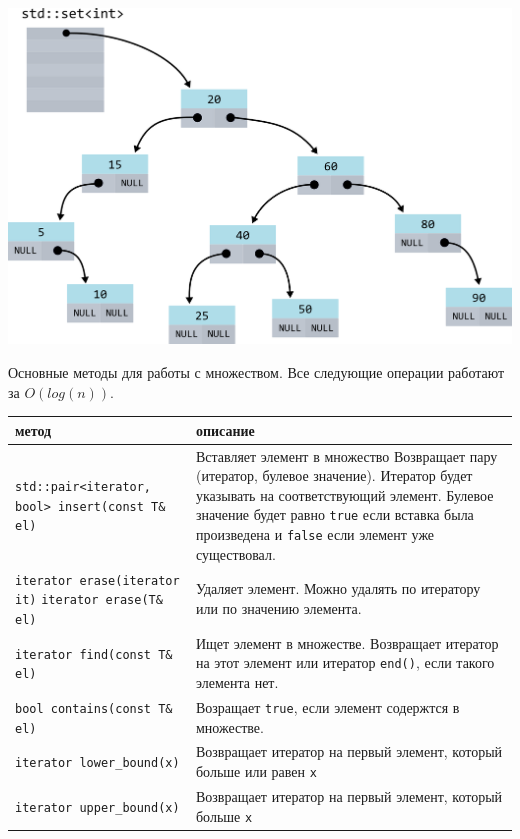 \documentclass{article}
\begin{document}
\begin{center}
\includegraphics[scale=1]{../images/set_internals.png}
\end{center}

Основные методы для работы с множеством. Все следующие операции работают за $O(log(n))$.

\bgroup
\def\arraystretch{2}%
\begin{tabular}{ p{5cm} | p{12cm} }
метод & описание 
\\ \hline

\texttt{std::pair<iterator, bool> \newline insert(const T\& el)}
& Вставляет элемент в множество \newline
Возвращает пару (итератор, булевое значение). Итератор будет указывать на соответствующий элемент.
Булевое значение будет равно \texttt{true} если вставка была произведена и \texttt{false} если
элемент уже существовал.
\\ \hline

\texttt{iterator erase(iterator it)}  \newline 
\texttt{iterator erase(T\& el)}
& Удаляет элемент. Можно удалять по итератору или по значению элемента.
\\ \hline

\texttt{iterator find(const T\& el)} & Ищет элемент в множестве.\newline
Возвращает итератор на этот элемент или итератор \texttt{end()}, если такого элемента нет.
\\ \hline

\texttt{bool contains(const T\& el)}  & Возращает \texttt{true}, если элемент содержтся в множестве.
\\ \hline

\texttt{iterator lower\_bound(x)}  & Возвращает итератор на первый элемент, который больше или равен \texttt{x}
\\ \hline
\texttt{iterator upper\_bound(x)}  & Возвращает итератор на первый элемент, который больше \texttt{x} \newline
\\
\end{tabular}
\egroup
\end{document}
